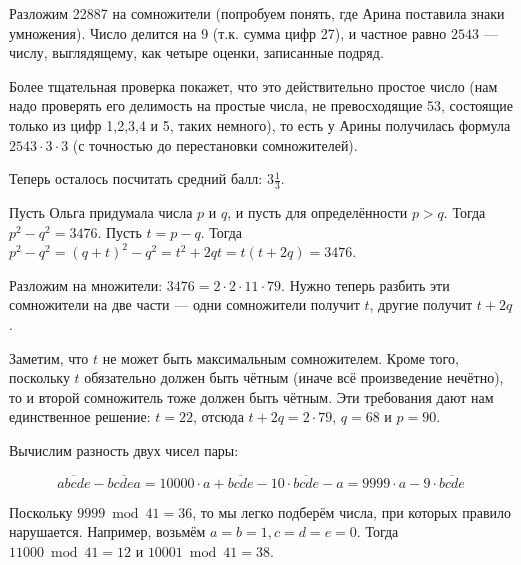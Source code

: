 \begin{itemize}
\itA Разложим 22887 на сомножители (попробуем понять, где Арина поставила знаки умножения). 
Число делится на 9 (т.к. сумма цифр 27), и
частное равно $2543$ --- числу, выглядящему, как четыре оценки, записанные подряд.

Более тщательная проверка покажет, что это действительно простое число (нам надо проверять его
делимость на простые числа, не превосходящие 53, состоящие только из цифр 1,2,3,4 и 5, таких немного),
то есть у Арины получилась формула $2543 \cdot 3 \cdot 3$ (с точностью до перестановки сомножителей).

Теперь осталось посчитать средний балл: $3\frac{1}{3}$.

\itB Пусть Ольга придумала числа $p$ и $q$, и пусть для определённости $p > q$. Тогда $p^2 - q^2 = 3476$.
Пусть $t = p - q$. Тогда $p^2 - q^2 = (q + t)^2 - q^2 = t^2 + 2qt = t(t + 2q) = 3476$.

Разложим на множители: $3476 = 2\cdot 2\cdot 11 \cdot 79$. Нужно теперь разбить эти сомножители
на две части --- одни сомножители получит $t$, другие получит $t+2q$. 

Заметим, что $t$ не может быть максимальным сомножителем. Кроме того, поскольку $t$ обязательно 
должен быть чётным (иначе всё произведение нечётно), то и второй сомножитель тоже должен быть
чётным. Эти требования дают нам единственное решение: $t = 22$, отсюда $t + 2q = 2 \cdot 79$,
$q = 68$ и $p = 90$.

\itC 

Вычислим разность двух чисел пары:

$$\overline{abcde} - \overline{bcdea} = 10000\cdot a + \overline{bcde} - 10\cdot\overline{bcde} - a = 9999\cdot a - 9 \cdot\overline{bcde}$$

Поскольку $9999 \bmod 41 = 36$, то мы легко подберём числа, при которых правило нарушается.
Например, возьмём $a = b = 1, c = d = e = 0$. Тогда $11000 \bmod 41 = 12$ и $10001 \bmod 41 = 38$.

\end{itemize}

